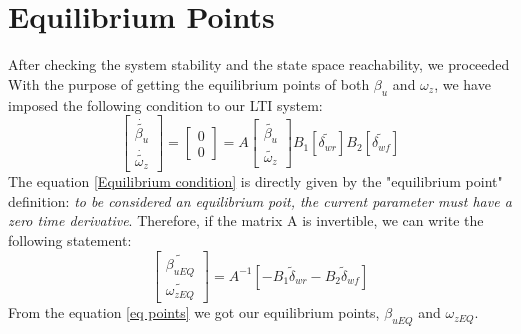 	\section{Equilibrium Points}
	After checking the system stability and the state space reachability, we proceeded With the purpose of getting the equilibrium points of both $\beta_{u}$ and $\omega_{z}$, we have imposed the following condition to our LTI system:
	\begin{equation} \label{Equilibrium condition}
	\begin{bmatrix}
	\dot{\tilde{\beta_{u}}} \\
	\dot{\tilde{\omega_{z}}}
	\end{bmatrix} =
	\begin{bmatrix}
	0 \\
	0
	\end{bmatrix} = A
	\begin{bmatrix}
	\tilde{\beta_{u}} \\
	\tilde{\omega_{z}}
	\end{bmatrix} 
	B_{1}[\tilde{\delta_{wr}}] B_{2}[\tilde{\delta_{wf}}]
	\end{equation}
	The equation \ref{Equilibrium condition} is directly given by the "equilibrium point" definition: \textit{to be considered an equilibrium poit, the current parameter must have a zero time derivative}. Therefore, if the matrix A is invertible, we can write the following statement:
	\begin{equation} \label{eq points}
	\begin{bmatrix}
	\tilde{\beta_{uEQ}} \\
	\tilde{\omega_{zEQ}}
	\end{bmatrix} = 
	A^{-1}[-B_{1} \tilde\delta_{wr} - B_{2} \tilde\delta_{wf}]
	\end{equation}
	From the equation \ref{eq points} we got our equilibrium points, $\beta_{uEQ}$ and $\omega_{zEQ}$.
	
